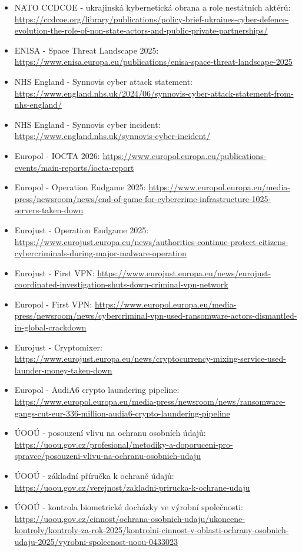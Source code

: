 \begin{itemize}
  \item NATO CCDCOE - ukrajinská kybernetická obrana a role nestátních aktérů: \url{https://ccdcoe.org/library/publications/policy-brief-ukraines-cyber-defence-evolution-the-role-of-non-state-actors-and-public-private-partnerships/}
  \item ENISA - Space Threat Landscape 2025: \url{https://www.enisa.europa.eu/publications/enisa-space-threat-landscape-2025}
  \item NHS England - Synnovis cyber attack statement: \url{https://www.england.nhs.uk/2024/06/synnovis-cyber-attack-statement-from-nhs-england/}
  \item NHS England - Synnovis cyber incident: \url{https://www.england.nhs.uk/synnovis-cyber-incident/}
  \item Europol - IOCTA 2026: \url{https://www.europol.europa.eu/publications-events/main-reports/iocta-report}
  \item Europol - Operation Endgame 2025: \url{https://www.europol.europa.eu/media-press/newsroom/news/end-of-game-for-cybercrime-infrastructure-1025-servers-taken-down}
  \item Eurojust - Operation Endgame 2025: \url{https://www.eurojust.europa.eu/news/authorities-continue-protect-citizens-cybercriminals-during-major-malware-operation}
  \item Eurojust - First VPN: \url{https://www.eurojust.europa.eu/news/eurojust-coordinated-investigation-shuts-down-criminal-vpn-network}
  \item Europol - First VPN: \url{https://www.europol.europa.eu/media-press/newsroom/news/cybercriminal-vpn-used-ransomware-actors-dismantled-in-global-crackdown}
  \item Eurojust - Cryptomixer: \url{https://www.eurojust.europa.eu/news/cryptocurrency-mixing-service-used-launder-money-taken-down}
  \item Europol - AudiA6 crypto laundering pipeline: \url{https://www.europol.europa.eu/media-press/newsroom/news/ransomware-gangs-cut-eur-336-million-audia6-crypto-laundering-pipeline}
  \item ÚOOÚ - posouzení vlivu na ochranu osobních údajů: \url{https://uoou.gov.cz/profesional/metodiky-a-doporuceni-pro-spravce/posouzeni-vlivu-na-ochranu-osobnich-udaju}
  \item ÚOOÚ - základní příručka k ochraně údajů: \url{https://uoou.gov.cz/verejnost/zakladni-prirucka-k-ochrane-udaju}
  \item ÚOOÚ - kontrola biometrické docházky ve výrobní společnosti: \url{https://uoou.gov.cz/cinnost/ochrana-osobnich-udaju/ukoncene-kontroly/kontroly-za-rok-2025/kontrolni-cinnost-v-oblasti-ochrany-osobnich-udaju-2025/vyrobni-spolecnost-uoou-0433023}

\end{itemize}
